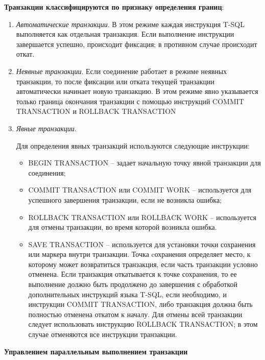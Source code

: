 \textbf{Транзакции классифицируются по признаку определения границ}:
\begin{enumerate}
	\item \textit{Автоматические транзакции}. В этом режиме каждая инструкция T-SQL выполняется как отдельная транзакция. Если выполнение инструкции завершается успешно, происходит фиксация; в противном случае происходит откат.
	\item \textit{Неявные транзакции}. Если соединение работает в режиме неявных транзакции, то после фиксации или отката текущей транзакции автоматически начинает новую транзакцию. В этом режиме явно указывается только граница окончания транзакции с помощью инструкций COMMIT TRANSACTION и ROLLBACK TRANSACTION
	\item \textit{Явные транзакции}.
	
	Для определения явных транзакций используются следующие инструкции:
	\begin{itemize}
		\item BEGIN TRANSACTION – задает начальную точку явной транзакции для соединения;
		\item COMMIT TRANSACTION или COMMIT WORK – используется для успешного завершения транзакции, если не возникла ошибка;
		\item ROLLBACK TRANSACTION или ROLLBACK WORK – используется для отмены транзакции, во время которой возникла ошибка.
		\item SAVE TRANSACTION – используется для установки точки сохранения или маркера внутри транзакции. Точка cохранения определяет место, к которому может возвратиться транзакция, если часть транзакции условно отменена. Если транзакция откатывается к точке сохранения, то ее выполнение должно быть продолжено до завершения с обработкой дополнительных инструкций языка T-SQL, если необходимо, и инструкции COMMIT TRANSACTION, либо транзакция должна быть полностью отменена откатом к началу. Для отмены всей транзакции следует использовать инструкцию ROLLBACK TRANSACTION; в этом случае отменяются все инструкции транзакции.
	\end{itemize}
\end{enumerate}

\textbf{Управлением параллельным выполнением транзакции}


